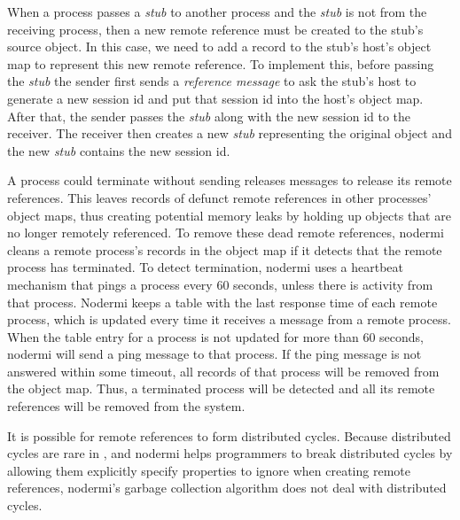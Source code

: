 When a process passes a \emph{stub} to another process and the \emph{stub}
is not from the receiving process, then a new remote reference must be created
to the stub's source object.  In this case, we need to add a record to
the stub's host's object map to represent this new remote reference.
To implement this, before passing the \emph{stub} the sender first
sends a \emph{reference message} to ask the stub's host to generate a
new session id and put that session id into the host's object map.  After
that, the sender passes the \emph{stub} along with the new session id to
the receiver.  The receiver then creates a new \emph{stub} representing
the original object and the new \emph{stub} contains the new session id.

A process could terminate without sending releases messages to release
its remote references.  This leaves records of defunct remote references
in other processes' object maps, thus creating potential memory leaks by
holding up objects that are no longer remotely referenced.  To remove
these dead remote references, nodermi cleans a remote process's records
in the object map if it detects that the remote process has terminated.
To detect termination, nodermi uses a heartbeat mechanism that pings
a process every 60 seconds, unless there is activity from that process.
Nodermi keeps a table with the last response time of each remote process,
which is updated every time it receives a message from a
remote process.  When the table entry for a process is not updated for
more than 60 seconds, nodermi will send a ping message to that process.
If the ping message is not answered within some timeout, all records of that
process will be removed from the object map.  Thus, a terminated process
will be detected and all its remote references will be removed from the system.

It is possible for remote references to form distributed cycles. 
Because distributed cycles are rare in \cb, and nodermi helps programmers
to break distributed cycles by allowing them explicitly specify properties
to ignore when creating remote references,
nodermi's garbage collection algorithm does not deal with distributed cycles. 





